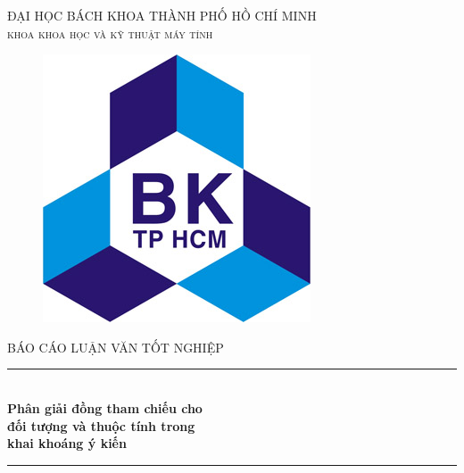 \documentclass[12pt]{report}
\begin{document}
\usetikzlibrary{arrows,chains,positioning,scopes}


\begin{titlepage}

\newcommand{\HRule}{\rule{\linewidth}{0.5mm}} %

\center %
 
\begin{flushright}
\end{flushright}
\textsc{\large ĐẠI HỌC BÁCH KHOA THÀNH PHỐ HỒ CHÍ MINH}\\[0.2cm]
\textsc{\Large \scshape khoa khoa học và kỹ thuật máy tính}\\[0.5cm]
\begin{figure}[H] 
\centering
\includegraphics[scale=1.6]{images/logo.jpg}
\end{figure} 

\textsc{\large BÁO CÁO LUẬN VĂN TỐT NGHIỆP}\\[0.2cm] %

\HRule \\[0.4cm]
{ \huge \bfseries Phân giải đồng tham chiếu cho \\ đối tượng và thuộc tính trong\\ khai khoáng ý kiến}\\[0.4cm] %
\HRule \\[0.8cm]


\end{titlepage}
\end{document}
